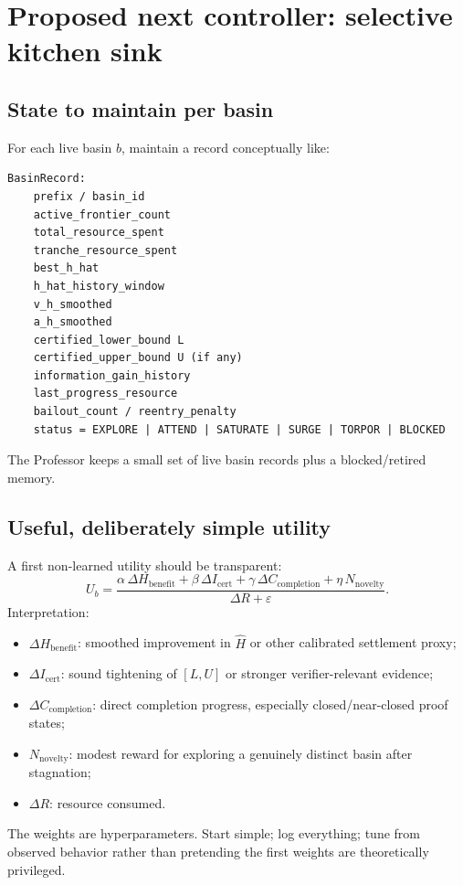 \documentclass[11pt]{article}
\begin{document}
\section{Proposed next controller: selective kitchen sink}

\subsection{State to maintain per basin}

For each live basin $b$, maintain a record conceptually like:
\begin{lstlisting}
BasinRecord:
    prefix / basin_id
    active_frontier_count
    total_resource_spent
    tranche_resource_spent
    best_h_hat
    h_hat_history_window
    v_h_smoothed
    a_h_smoothed
    certified_lower_bound L
    certified_upper_bound U (if any)
    information_gain_history
    last_progress_resource
    bailout_count / reentry_penalty
    status = EXPLORE | ATTEND | SATURATE | SURGE | TORPOR | BLOCKED
\end{lstlisting}

The Professor keeps a small set of live basin records plus a blocked/retired memory.

\subsection{Useful, deliberately simple utility}

A first non-learned utility should be transparent:
\[
U_b=
\frac{
\alpha\,\Delta H_{\mathrm{benefit}}
+\beta\,\Delta I_{\mathrm{cert}}
+\gamma\,\Delta C_{\mathrm{completion}}
+\eta\,N_{\mathrm{novelty}}
}{\Delta R+\varepsilon}.
\]
Interpretation:
\begin{itemize}
\item $\Delta H_{\mathrm{benefit}}$: smoothed improvement in $\widehat H$ or other calibrated settlement proxy;
\item $\Delta I_{\mathrm{cert}}$: sound tightening of $[L,U]$ or stronger verifier-relevant evidence;
\item $\Delta C_{\mathrm{completion}}$: direct completion progress, especially closed/near-closed proof states;
\item $N_{\mathrm{novelty}}$: modest reward for exploring a genuinely distinct basin after stagnation;
\item $\Delta R$: resource consumed.
\end{itemize}
The weights are hyperparameters. Start simple; log everything; tune from observed behavior rather than pretending the first weights are theoretically privileged.
\end{document}
